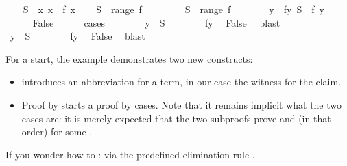 \begin{isabellebody}
%
\isadelimproof
%
\endisadelimproof
%
\isatagproof
\isamarkupfalse%
\isanewline
\ \ \isamarkupfalse%
\ {\isacharquery}S\ {\isacharequal}\ {\isachardoublequote}{\isacharbraceleft}x{\isachardot}\ x\ {\isasymnotin}\ f\ x{\isacharbraceright}{\isachardoublequote}\isanewline
\ \ \isamarkupfalse%
\ {\isachardoublequote}{\isacharquery}S\ {\isasymnotin}\ range\ f{\isachardoublequote}\isanewline
\ \ \isamarkupfalse%
\isanewline
\ \ \ \ \isamarkupfalse%
\ {\isachardoublequote}{\isacharquery}S\ {\isasymin}\ range\ f{\isachardoublequote}\isanewline
\ \ \ \ \isamarkupfalse%
\ \isamarkupfalse%
\ y\ \ fy{\isacharcolon}\ {\isachardoublequote}{\isacharquery}S\ {\isacharequal}\ f\ y{\isachardoublequote}\ \isamarkupfalse%
\isacommand{{\isachardot}{\isachardot}}\isanewline
\ \ \ \ \isamarkupfalse%
\ False\isanewline
\ \ \ \ \isamarkupfalse%
\ cases\isanewline
\ \ \ \ \ \ \isamarkupfalse%
\ {\isachardoublequote}y\ {\isasymin}\ {\isacharquery}S{\isachardoublequote}\isanewline
\ \ \ \ \ \ \isamarkupfalse%
\ fy\ \isamarkupfalse%
\ False\ \isamarkupfalse%
\ blast\isanewline
\ \ \ \ \isamarkupfalse%
\isanewline
\ \ \ \ \ \ \isamarkupfalse%
\ {\isachardoublequote}y\ {\isasymnotin}\ {\isacharquery}S{\isachardoublequote}\isanewline
\ \ \ \ \ \ \isamarkupfalse%
\ fy\ \isamarkupfalse%
\ False\ \isamarkupfalse%
\ blast\isanewline
\ \ \ \ \isamarkupfalse%
\isanewline
\ \ \isamarkupfalse%
\isanewline
\isamarkupfalse%
%
\endisatagproof
{\isafoldproof}%
%
\isadelimproof
%
\endisadelimproof
\isamarkuptrue%
%
\begin{isamarkuptext}%
\noindent
For a start, the example demonstrates two new constructs:
\begin{itemize}
\item {} introduces an abbreviation for a term, in our case
the witness for the claim.
\item Proof by  starts a proof by cases. Note that it remains
implicit what the two cases are: it is merely expected that the two subproofs
prove  and  (in that order)
for some .
\end{itemize}
If you wonder how to  :
via the predefined elimination rule .


\end{isamarkuptext}
\end{isabellebody}
